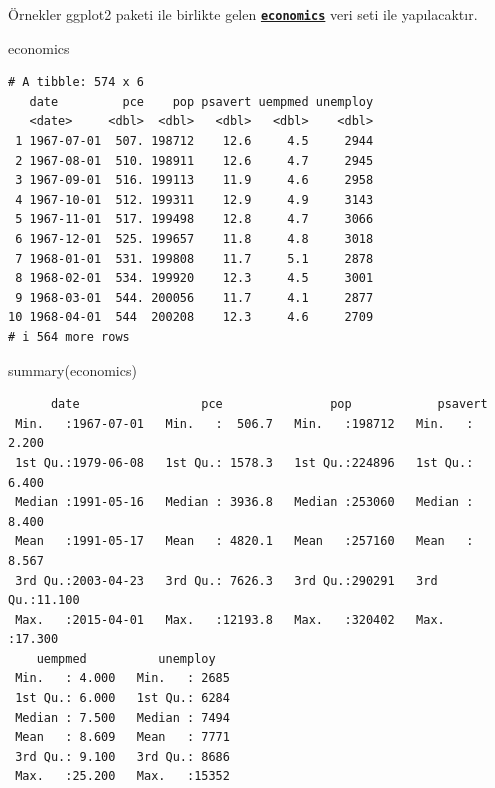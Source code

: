 \documentclass[
  letterpaper,
  DIV=11,
  numbers=noendperiod]{scrreprt}
\newenvironment{Shaded}{\begin{snugshade}}{\end{snugshade}}
\newcommand{\FunctionTok}[1]{\textcolor[rgb]{0.28,0.35,0.67}{#1}}
\newcommand{\NormalTok}[1]{\textcolor[rgb]{0.00,0.23,0.31}{#1}}
\begin{document}
Örnekler ggplot2 paketi ile birlikte gelen
\href{https://ggplot2.tidyverse.org/reference/economics.html}{\textbf{\texttt{economics}}}
veri seti ile yapılacaktır.

\begin{Shaded}
\begin{Highlighting}[]
\NormalTok{economics}
\end{Highlighting}
\end{Shaded}

\begin{verbatim}
# A tibble: 574 x 6
   date         pce    pop psavert uempmed unemploy
   <date>     <dbl>  <dbl>   <dbl>   <dbl>    <dbl>
 1 1967-07-01  507. 198712    12.6     4.5     2944
 2 1967-08-01  510. 198911    12.6     4.7     2945
 3 1967-09-01  516. 199113    11.9     4.6     2958
 4 1967-10-01  512. 199311    12.9     4.9     3143
 5 1967-11-01  517. 199498    12.8     4.7     3066
 6 1967-12-01  525. 199657    11.8     4.8     3018
 7 1968-01-01  531. 199808    11.7     5.1     2878
 8 1968-02-01  534. 199920    12.3     4.5     3001
 9 1968-03-01  544. 200056    11.7     4.1     2877
10 1968-04-01  544  200208    12.3     4.6     2709
# i 564 more rows
\end{verbatim}

\begin{Shaded}
\begin{Highlighting}[]
\FunctionTok{summary}\NormalTok{(economics)}
\end{Highlighting}
\end{Shaded}

\begin{verbatim}
      date                 pce               pop            psavert      
 Min.   :1967-07-01   Min.   :  506.7   Min.   :198712   Min.   : 2.200  
 1st Qu.:1979-06-08   1st Qu.: 1578.3   1st Qu.:224896   1st Qu.: 6.400  
 Median :1991-05-16   Median : 3936.8   Median :253060   Median : 8.400  
 Mean   :1991-05-17   Mean   : 4820.1   Mean   :257160   Mean   : 8.567  
 3rd Qu.:2003-04-23   3rd Qu.: 7626.3   3rd Qu.:290291   3rd Qu.:11.100  
 Max.   :2015-04-01   Max.   :12193.8   Max.   :320402   Max.   :17.300  
    uempmed          unemploy    
 Min.   : 4.000   Min.   : 2685  
 1st Qu.: 6.000   1st Qu.: 6284  
 Median : 7.500   Median : 7494  
 Mean   : 8.609   Mean   : 7771  
 3rd Qu.: 9.100   3rd Qu.: 8686  
 Max.   :25.200   Max.   :15352  
\end{verbatim}
\end{document}
